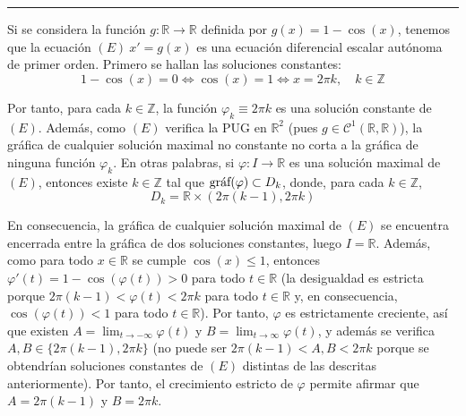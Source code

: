 \documentclass[11pt]{report}
\newcommand{\R}{\mathbb R}
\newcommand{\Z}{\mathbb Z}
\begin{document}
\vspace{4mm}

\hrule

\vspace{4mm}

Si se considera la función $g \colon \R \to \R$ definida por $g(x)=1-\cos(x)$, tenemos que la ecuación $(E) \ x'=g(x)$ es una ecuación diferencial escalar autónoma de primer orden. Primero se hallan las soluciones constantes:
\[1-\cos(x)=0 \iff \cos(x)=1 \iff x=2\pi k, \quad k \in \Z\]

Por tanto, para cada $k \in \Z$, la función $\varphi_k \equiv 2\pi k$ es una solución constante de $(E)$. Además, como $(E)$ verifica la PUG en $\R^2$ (pues $g \in \mathcal{C}^1(\R,\R)$), la gráfica de cualquier solución maximal no constante no corta a la gráfica de ninguna función $\varphi_k$. En otras palabras, si $\varphi \colon I \to \R$ es una solución maximal de $(E)$, entonces existe $k \in \Z$ tal que $\textup{gráf}(\varphi) \subset D_k$, donde, para cada $k \in \Z$,
\[D_k=\R \times (2\pi (k-1),2\pi k)\]

En consecuencia, la gráfica de cualquier solución maximal de $(E)$ se encuentra encerrada entre la gráfica de dos soluciones constantes, luego $I = \R$. Además, como para todo $x \in \R$ se cumple $\cos(x) \leq 1$, entonces $\varphi'(t)=1-\cos(\varphi(t))>0$ para todo $t \in \R$ (la desigualdad es estricta porque $2\pi (k-1)<\varphi(t)<2\pi k$ para todo $t \in \R$ y, en consecuencia, $\cos(\varphi(t))< 1$ para todo $t \in \R$). Por tanto, $\varphi$ es estrictamente creciente, así que existen $A=\lim_{t \to -\infty} \varphi(t)$ y $B=\lim_{t \to \infty} \varphi(t)$, y además se verifica $A,B \in \{2\pi(k-1), 2\pi k\}$ (no puede ser $2\pi (k-1)<A,B<2\pi k$ porque se obtendrían soluciones constantes de $(E)$ distintas de las descritas anteriormente). Por tanto, el crecimiento estricto de $\varphi$ permite afirmar que $A=2\pi(k-1)$ y $B=2\pi k$.
\end{document}
